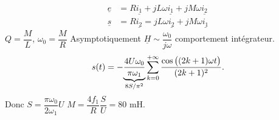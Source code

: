 \begin{solution}
   \begin{questions}
       \questioncours ~
       \question \begin{align*}
           \underline{e} &= R\underline{i_1} + jL\omega\underline{i_1} + jM\omega\underline{i_2} \\
           \underline{s} &= R\underline{i_2} = jL\omega\underline{i_2} + jM\omega\underline{i_1}
       \end{align*}
       \question $Q = \dfrac{M}{L}$, $\omega_0 = \dfrac{M}{R}$
       \question Asymptotiquement $\underline{H} \sim \dfrac{\omega_0}{j\omega}$ comportement intégrateur.
       \question $$s(t) = -\underset{8S/\pi^2}{\underbrace{\dfrac{4U\omega_0}{\pi\omega_1}}}\sum_{k=0}^{+\infty}\dfrac{\cos\qty\big((2k+1)\omega t)}{(2k+1)^2}.$$
       Donc $S = \dfrac{\pi\omega_0}{2\omega_1}U$
       \question $M = \dfrac{4 f_1}{R}\dfrac{S}{U} = 80$ mH.
   \end{questions}
\end{solution}